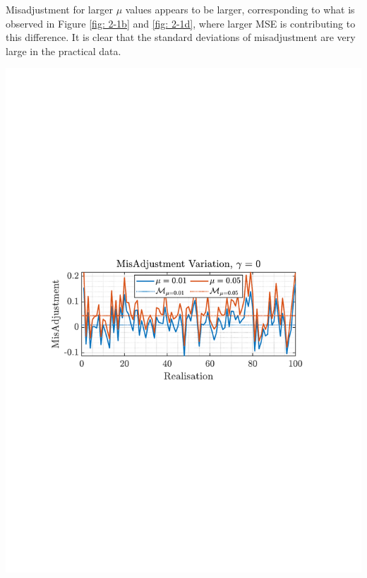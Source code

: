 \documentclass[12pt]{article}
\begin{document}
			\begin{minipage}[b]{0.49\textwidth}
				Misadjustment for larger $\mu$ values appears to be larger, corresponding to what is observed in Figure \ref{fig: 2-1b} and \ref{fig: 2-1d}, where larger MSE is contributing to this difference. It is clear that the standard deviations of misadjustment are very large in the practical data.
			\end{minipage}%
			\begin{minipage}{0.04\textwidth}
				\hspace*{0.04\textwidth}
			\end{minipage}%
			\begin{minipage}[t]{0.49\textwidth}
				\centering
				\includegraphics[trim={2.2cm 11.2cm 3.15cm  11.2cm}, clip, width=\textwidth]{../MATLAB/figures/q2_1cd_fig01.pdf} 
				\captionsetup{justification=centering}
				\label{fig: 2-1c}			
			\end{minipage}%
\end{document}
